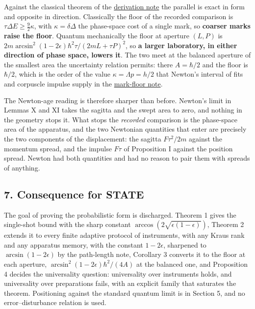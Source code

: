 \documentclass[11pt,a4paper]{article}
\begin{document}
Against the classical theorem of the
\href{planck-gap-derivation.md}{derivation note} the parallel is exact
in form and opposite in direction. Classically the floor of the recorded
comparison is \(\tau\Delta E\ge\frac92\kappa\), with
\(\kappa=\delta\Delta\) the phase-space cost of a single mark, so
\textbf{coarser marks raise the floor}. Quantum mechanically the floor
at aperture \((L,P)\) is
\(2m\arcsin^2(1-2\epsilon)\hbar^2\tau/(2mL+\tau P)^2\), so \textbf{a
larger laboratory, in either direction of phase space, lowers it}. The
two meet at the balanced aperture of the smallest area the uncertainty
relation permits: there \(A=\hbar/2\) and the floor is \(\hbar/2\),
which is the order of the value \(\kappa=\Lambda p=h/2\) that Newton's
interval of fits and corpuscle impulse supply in the
\href{newton-mark-floor.md}{mark-floor note}.

The Newton-age reading is therefore sharper than before. Newton's limit
in Lemmas X and XI takes the sagitta and the swept area to zero, and
nothing in the geometry stops it. What stops the \emph{recorded}
comparison is the phase-space area of the apparatus, and the two
Newtonian quantities that enter are precisely the two components of the
displacement: the sagitta \(F\tau^2/2m\) against the momentum spread,
and the impulse \(F\tau\) of Proposition I against the position spread.
Newton had both quantities and had no reason to pair them with spreads
of anything.

\hypertarget{consequence-for-state}{%
\subsection{7. Consequence for STATE}\label{consequence-for-state}}

The goal of proving the probabilistic form is discharged. Theorem 1
gives the single-shot bound with the sharp constant
\(\arccos(2\sqrt{\epsilon(1-\epsilon)})\), Theorem 2 extends it to every
finite adaptive protocol of instruments, with any Kraus rank and any
apparatus memory, with the constant \(1-2\epsilon\), sharpened to
\(\arcsin(1-2\epsilon)\) by the path-length note, Corollary 3 converts
it to the floor at each aperture, \(\arcsin^2(1-2\epsilon)\hbar^2/(4A)\)
at the balanced one, and Proposition 4 decides the universality
question: universality over instruments holds, and universality over
preparations fails, with an explicit family that saturates the theorem.
Positioning against the standard quantum limit is in Section 5, and no
error--disturbance relation is used.
\end{document}
